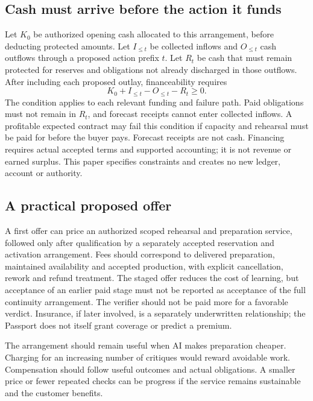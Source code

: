 \documentclass[11pt,a4paper]{article}
\begin{document}
\subsection{Cash must arrive before the action it funds}
Let $K_0$ be authorized opening cash allocated to this arrangement, before deducting protected amounts. Let $I_{\leq t}$ be collected inflows and $O_{\leq t}$ cash outflows through a proposed action prefix $t$. Let $R_t$ be cash that must remain protected for reserves and obligations not already discharged in those outflows. After including each proposed outlay, financeability requires
\begin{equation}
K_0+I_{\leq t}-O_{\leq t}-R_t\geq 0.
\end{equation}
The condition applies to each relevant funding and failure path. Paid obligations must not remain in $R_t$, and forecast receipts cannot enter collected inflows. A profitable expected contract may fail this condition if capacity and rehearsal must be paid for before the buyer pays. Forecast receipts are not cash. Financing requires actual accepted terms and supported accounting; it is not revenue or earned surplus. This paper specifies constraints and creates no new ledger, account or authority.

\subsection{A practical proposed offer}
A first offer can price an authorized scoped rehearsal and preparation service, followed only after qualification by a separately accepted reservation and activation arrangement. Fees should correspond to delivered preparation, maintained availability and accepted production, with explicit cancellation, rework and refund treatment. The staged offer reduces the cost of learning, but acceptance of an earlier paid stage must not be reported as acceptance of the full continuity arrangement. The verifier should not be paid more for a favorable verdict. Insurance, if later involved, is a separately underwritten relationship; the Passport does not itself grant coverage or predict a premium.

The arrangement should remain useful when AI makes preparation cheaper. Charging for an increasing number of critiques would reward avoidable work. Compensation should follow useful outcomes and actual obligations. A smaller price or fewer repeated checks can be progress if the service remains sustainable and the customer benefits.
\end{document}
